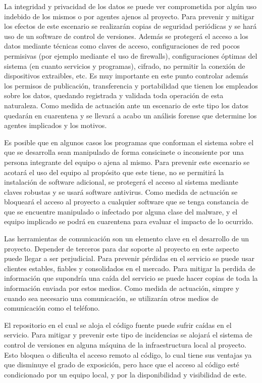 La integridad y privacidad de los datos se puede ver comprometida por algún uso indebido de los mismos o por agentes ajenos al proyecto. Para prevenir y mitigar los efectos de este escenario 
se realizarán copias de seguridad  periódicas y se hará uso de un software de control de versiones. Además se protegerá el acceso a los datos mediante técnicas como claves de acceso, configuraciones de red pocos permisivas
(por ejemplo mediante el uso de firewalls), configuraciones óptimas del sistema (en cuanto servicios y programas), cifrado, no permitir la conexión de dispositivos extraibles, etc. Es muy importante en este punto 
controlar además los permisos de publicación, transferencia y portabilidad que tienen los empleados sobre los datos, quedando registrada y validada toda operación de esta naturaleza. Como medida de
actuación ante un escenario de este tipo los datos quedarán en cuarentena y se llevará a acabo un análisis forense que determine los agentes implicados y los motivos.

Es posible que en algunos casos los programas que conforman el sistema sobre el que se desarrolla sean manipulado de forma consicinete o inconsiente por una persona integrante del equipo o ajena 
al mismo. Para prevenir este escenario se acotará el uso del equipo al propósito que este tiene, no se permitirá la instalación de software adicional, se protegerá el acceso al sistema mediante claves robustas y se 
usará software antivirus. Como medida de actuación se bloqueará el acceso al proyecto a cualquier software que se tenga constancia de que se encuentre manipulado o infectado por alguna clase del 
malware, y el equipo implicado se podrá en cuarentena para evaluar el impacto de lo ocurrido.  

Las herramientas de comunicación son un elemento clave en el desarrollo de un proyecto. Depender de terceros para dar soporte al proyecto en este aspecto puede llegar a ser perjudicial. Para 
prevenir pérdidas en el servicio se puede usar clientes estables, fiables y consolidados en el mercado. Para mitigar la perdida de información que supondría una caída del servicio se puede hacer
copias de toda la información enviada por estos medios. Como medida de actuación, simpre y cuando sea necesario una comunicación, se utilizarán otros medios de comunicación como el teléfono. 

El repositorio en el cual se aloja el código fuente puede sufrir caídas en el servicio. Para mitigar y prevenir este tipo de incidencias se alojará el sistema de control de versiones en alguna
máquina de la infraestructura local al proyecto. Esto bloquea o dificulta el acceso remoto al código, lo cual tiene sus ventajas ya que disminuye el grado de exposición, pero hace que el acceso 
al código esté condicionado por un equipo local, y por la disponibilidad y visibilidad de este. 

